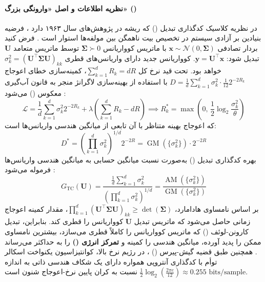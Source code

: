 \paragraph*{نظریه اطلاعات و اصل «وارونگی بزرگ» ()}
در نظریه کلاسیک کدگذاری تبدیل () که ریشه در پژوهش‌های سال ۱۹۶۳ دارد \cite{huang1963block, goyal2001theoretical}، فرضیه بنیادین بر آزادی سیستم در تخصیص بیت ناهمگن بین مولفه‌ها استوار است \cite{jokar2026transforms}. فرض کنید بردار تصادفی $\mathbf{x} \sim \mathcal{N}(0, \boldsymbol{\Sigma})$ با ماتریس کوواریانس $\boldsymbol{\Sigma} \succ 0$ توسط ماتریس متعامد $\mathbf{U}$ تبدیل شود: $\mathbf{y} = \mathbf{U}^\top \mathbf{x}$. کوواریانس جدید دارای واریانس‌های قطری $\sigma_k^2 = (\mathbf{U}^\top \boldsymbol{\Sigma} \mathbf{U})_{kk}$ خواهد بود. تحت قید نرخ کل $\sum_{k=1}^d R_k = dR$، کمینه‌سازی خطای اعوجاج $D = \frac{1}{d}\sum_{k=1}^d \sigma_k^2 \cdot \frac{1}{12} 2^{-2R_k}$ با استفاده از بهینه‌سازی لاگرانژ منجر به قانون آب‌گیری معکوس () می‌شود \cite{cover2006elements}:
\begin{equation}
    \mathcal{L} = \frac{1}{d}\sum_{k=1}^d \sigma_k^2 2^{-2R_k} + \lambda \left(\sum_{k=1}^d R_k - dR\right) \implies R_k^* = \max\left(0, \, \frac{1}{2} \log_2 \frac{\sigma_k^2}{\theta}\right)
\end{equation}
که اعوجاج بهینه متناظر با آن تابعی از میانگین هندسی واریانس‌ها است:
\begin{equation}
    D^* = \left(\prod_{k=1}^d \sigma_k^2\right)^{1/d} 2^{-2R} = \operatorname{GM}(\{\sigma_k^2\}) \cdot 2^{-2R}
\end{equation}
بهره کدگذاری تبدیل () به‌صورت نسبت میانگین حسابی به میانگین هندسی واریانس‌ها فرموله می‌شود \cite{goyal2001theoretical}:
\begin{equation}
    G_{\text{TC}}(\mathbf{U}) = \frac{\frac{1}{d}\sum_{k=1}^d \sigma_k^2}{\left(\prod_{k=1}^d \sigma_k^2\right)^{1/d}} = \frac{\operatorname{AM}(\{\sigma_k^2\})}{\operatorname{GM}(\{\sigma_k^2\})}
\end{equation}
بر اساس نامساوی هادامارد، $\prod_{k=1}^d (\mathbf{U}^\top \boldsymbol{\Sigma} \mathbf{U})_{kk} \ge \det(\boldsymbol{\Sigma})$، مقدار کمینه اعوجاج زمانی حاصل می‌شود که ماتریس تبدیل $\mathbf{U}$ کوواریانس را قطری کند. بنابراین، تبدیل کارونن-لوئف () که ماتریس کوواریانس را کاملاً قطری می‌سازد، بیشترین نامساوی ممکن را پدید آورده، میانگین هندسی را کمینه و \textbf{تمرکز انرژی ()} را به حداکثر می‌رساند \cite{jokar2026transforms}. همچنین طبق قضیه گیش-پیرس () \cite{gish1968asymptotically}، در رژیم نرخ بالا، کوانتیزاسیون یکنواخت اسکالر توأم با کدگذاری آنتروپی همواره دارای یک شکاف هندسی ذاتی به اندازه $\frac{1}{2}\log_2(\frac{2\pi e}{12}) \approx 0.255\text{ bits/sample}$ نسبت به کران پایین نرخ-اعوجاج شنون است.

